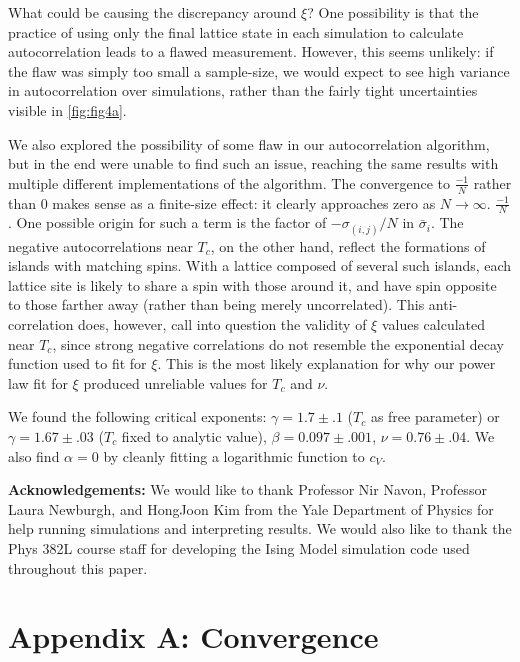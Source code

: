 \documentclass[letter,scriptaddress,twocolumn, prl,nofootinbib]{revtex4}
\begin{document}
What could be causing the discrepancy around $\xi$? One possibility is that the practice of using only the final lattice state in each simulation to calculate autocorrelation leads to a flawed measurement. However, this seems unlikely: if the flaw was simply too small a sample-size, we would expect to see high variance in autocorrelation over simulations, rather than the fairly tight uncertainties visible in \autoref{fig:fig4a}.

We also explored the possibility of some flaw in our autocorrelation algorithm, but in the end were unable to find such an issue, reaching the same results with multiple different implementations of the algorithm. The convergence to $\frac{-1}{N}$ rather than $0$ makes sense as a finite-size effect: it clearly approaches zero as $N \rightarrow \infty$. $\frac{-1}{N}$. One possible origin for such a term is the factor of $-\sigma_{(i, j)}/N$ in $\bar{\sigma}_i$. The negative autocorrelations near $T_c$, on the other hand, reflect the formations of islands with matching spins. With a lattice composed of several such islands, each lattice site is likely to share a spin with those around it, and have spin opposite to those farther away (rather than being merely uncorrelated). This anti-correlation does, however, call into question the validity of $\xi$ values calculated near $T_c$, since strong negative correlations do not resemble the exponential decay function used to fit for $\xi$. This is the most likely explanation for why our power law fit for $\xi$ produced unreliable values for $T_c$ and $\nu$.

We found the following critical exponents: $\gamma = 1.7 \pm .1$ ($T_c$ as free parameter) or $\gamma = 1.67 \pm .03$ ($T_c$ fixed to analytic value), $\beta = 0.097 \pm .001$, $\nu = 0.76 \pm .04$. We also find $\alpha = 0$ by cleanly fitting a logarithmic function to $c_V$. 

\textbf{Acknowledgements:}
	We would like to thank Professor Nir Navon, Professor Laura Newburgh, and HongJoon Kim from the Yale Department of Physics for help running simulations and interpreting results. We would also like to thank the Phys 382L course staff for developing the Ising Model simulation code used throughout this paper.
	
 


\appendix
\section{Appendix A: Convergence}
\end{document}
